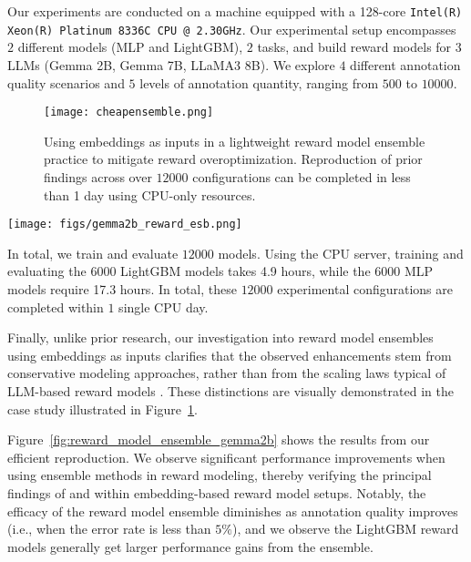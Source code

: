 Our experiments are conducted on a machine equipped with a 128-core \texttt{Intel(R) Xeon(R) Platinum 8336C CPU @ 2.30GHz}. Our experimental setup encompasses $2$ different models (MLP and LightGBM), $2$ tasks, and build reward models for $3$ LLMs (Gemma 2B, Gemma 7B, LLaMA3 8B). We explore $4$ different annotation quality scenarios and $5$ levels of annotation quantity, ranging from $500$ to $10000$.
\begin{figure}[h!]
    \texttt{[image: cheapensemble.png]}
    \vspace{-0.6cm}
    \caption{\small Using embeddings as inputs in a lightweight reward model ensemble practice to mitigate reward overoptimization. Reproduction of prior findings across over $12000$ configurations can be completed in less than 1 day using CPU-only resources.}\vspace{-0.35cm}
    \label{fig:rm_ensemble_illu}
\end{figure}
\begin{figure*}[t!]
    \centering
    \texttt{[image: figs/gemma2b\_reward\_esb.png]}\vspace{-0.65cm}
    \caption{\small Reproduction of reward model ensemble papers using embedding-based reward models. Additional results using the Gemma 7B and LLaMA3 8B models are presented in Appendix~\ref{appdx:more_results}}
    \label{fig:reward_model_ensemble_gemma2b}\vspace{-0.35cm}
\end{figure*}

In total, we train and evaluate $12000$ models. Using the CPU server, training and evaluating the $6000$ LightGBM models takes 4.9 hours, while the $6000$ MLP models require 17.3 hours. In total, these $12000$ experimental configurations are completed within $1$ single CPU day.

Finally, unlike prior research, our investigation into reward model ensembles using embeddings as inputs clarifies that the observed enhancements stem from conservative modeling approaches, rather than from the scaling laws typical of LLM-based reward models \citep{gao2023scaling}. These distinctions are visually demonstrated in the case study illustrated in Figure~\ref{fig:rm_ensemble_illu}. 

Figure~\ref{fig:reward_model_ensemble_gemma2b} shows the results from our efficient reproduction. We observe significant performance improvements when using ensemble methods in reward modeling, thereby verifying the principal findings of \citet{coste2023reward} and \citet{ahmed2024scalable} within embedding-based reward model setups. Notably, the efficacy of the reward model ensemble diminishes as annotation quality improves (i.e., when the error rate is less than $5\%$), and we observe the LightGBM reward models generally get larger performance gains from the ensemble.



